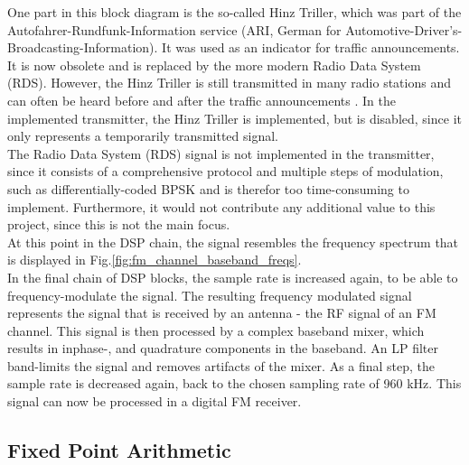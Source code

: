 One part in this block diagram is the so-called Hinz Triller, which was part of the Autofahrer-Rundfunk-Information service (ARI, German for Automotive-Driver's-Broadcasting-Information).
It was used as an indicator for traffic announcements.
It is now obsolete and is replaced by the more modern Radio Data System (RDS).
However, the Hinz Triller is still transmitted in many radio stations and can often be heard before and after the traffic announcements \cite{HinzTriller}.
In the implemented transmitter, the Hinz Triller is implemented, but is disabled, since it only represents a temporarily transmitted signal.\\

The Radio Data System (RDS) signal is not implemented in the transmitter, since it consists of a comprehensive protocol and multiple steps of modulation, such as differentially-coded BPSK \cite{IntroFmStereoRdsModulation} and is therefor too time-consuming to implement.
Furthermore, it would not contribute any additional value to this project, since this is not the main focus.\\

At this point in the DSP chain, the signal resembles the frequency spectrum that is displayed in Fig.\ref{fig:fm_channel_baseband_freqs}.\\

In the final chain of DSP blocks, the sample rate is increased again, to be able to frequency-modulate the signal.
The resulting frequency modulated signal represents the signal that is received by an antenna - the RF signal of an FM channel.
This signal is then processed by a complex baseband mixer, which results in inphase-, and quadrature components in the baseband.
An LP filter band-limits the signal and removes artifacts of the mixer.
As a final step, the sample rate is decreased again, back to the chosen sampling rate of 960 kHz.
This signal can now be processed in a digital FM receiver.


\subsection{Fixed Point Arithmetic}

